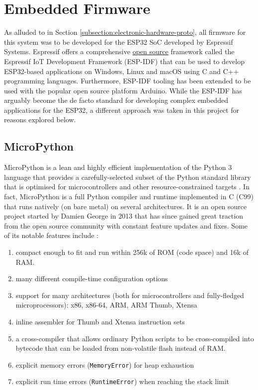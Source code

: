 \section{Embedded Firmware}
As alluded to in Section \ref{subsection:electronic-hardware-proto}, all firmware for this system was to be developed for the ESP32 SoC developed by Espressif Systems. Espressif offers a comprehensive \href{https://github.com/espressif/esp-idf}{open source} framework called the Espressif IoT Development Framework (ESP-IDF) that can be used to develop ESP32-based applications on Windows, Linux and macOS using C and C++ programming languages. Furthermore, ESP-IDF tooling has been extended to be used with the popular open source platform Arduino. While the ESP-IDF has arguably become the de facto standard for developing complex embedded applications for the ESP32, a different approach was taken in this project for reasons explored below. 

\subsection{MicroPython}
MicroPython is a lean and highly efficient implementation of the Python 3 language that provides a carefully-selected subset of the Python standard library that is optimised for microcontrollers and other resource-constrained targets \cite{micropython}. In fact, MicroPython is a full Python compiler and runtime implemented in C (C99) that runs natively (on bare metal) on several architectures. It is an open source project started by Damien George in 2013 that has since gained great traction from the open source community with constant feature updates and fixes. Some of its notable features include \cite{micropython}: 
\begin{enumerate}
    \item compact enough to fit and run within 256k of ROM (code space) and 16k of RAM.
    \item many different compile-time configuration options
    \item support for many architectures (both for microcontrollers and fully-fledged microprocessors): x86, x86-64, ARM, ARM Thumb, Xtensa
    \item inline assembler for Thumb and Xtensa instruction sets
    \item a cross-compiler that allows ordinary Python scripts to be cross-compiled into bytecode that can be loaded from non-volatile flash instead of RAM.
    \item explicit memory errors (\texttt{MemoryError}) for heap exhaustion
    \item explicit run time errors (\texttt{RuntimeError}) when reaching the stack limit
\end{enumerate}

